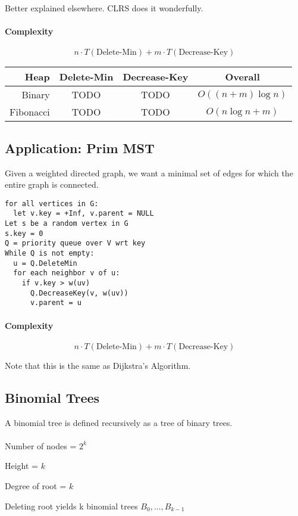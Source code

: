 \documentclass[a4paper]{article}
\newenvironment{itemize*}%
  {\begin{itemize}%
    \setlength{\itemsep}{0pt}%
    \setlength{\parsep}{0pt}%
    \setlength{\parskip}{0pt}}%
  {\end{itemize}}
\begin{document}
Better explained elsewhere. CLRS does it wonderfully.

\paragraph{Complexity}

\[
n \cdot T(\text{Delete-Min}) + m \cdot T(\text{Decrease-Key})
\]

\begin{tabu} to \linewidth{|r|c|c|c|}
\hline
Heap & Delete-Min & Decrease-Key & Overall \\
\hline
Binary & TODO & TODO & $O((n+m)\log n)$ \\
\hline
Fibonacci & TODO & TODO & $O(n\log n + m)$ \\
\hline
\end{tabu}

\subsection{Application: Prim MST}
Given a weighted directed graph, we want a minimal set of edges for which the entire graph is connected.

\begin{lstlisting}[frame=L]
for all vertices in G:
  let v.key = +Inf, v.parent = NULL
Let s be a random vertex in G
s.key = 0
Q = priority queue over V wrt key
While Q is not empty:
  u = Q.DeleteMin
  for each neighbor v of u:
    if v.key > w(uv)
      Q.DecreaseKey(v, w(uv))
      v.parent = u
\end{lstlisting}

\paragraph{Complexity}

\[
n \cdot T(\text{Delete-Min}) + m \cdot T(\text{Decrease-Key})
\]

Note that this is the same as Dijkstra's Algorithm.

\subsection{Binomial Trees}
A binomial tree is defined recursively as a tree of binary trees.

\paragraph{}

\begin{itemize*}
\item Number of nodes = $2^k$
\item Height = $k$
\item Degree of root = $k$
\item Deleting root yields k binomial trees $B_0,...,B_{k-1}$
\end{itemize*}
\end{document}
